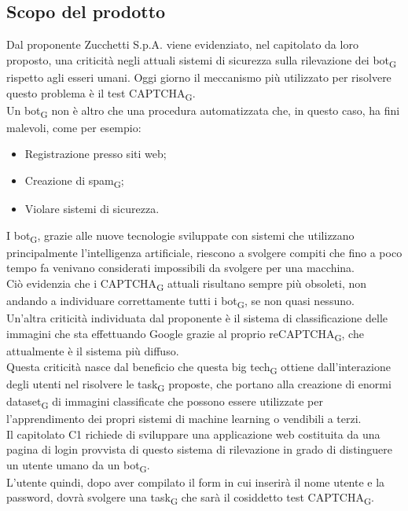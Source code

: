\subsection{Scopo del prodotto}
Dal proponente Zucchetti S.p.A. viene evidenziato, nel capitolato da loro proposto, una criticità negli attuali sistemi di sicurezza sulla rilevazione dei bot\textsubscript{G} rispetto agli esseri umani. Oggi giorno il meccanismo più utilizzato per risolvere questo problema è il test CAPTCHA\textsubscript{G}.\\
Un bot\textsubscript{G} non è altro che una procedura automatizzata che, in questo caso, ha fini malevoli, come per esempio:
\begin{itemize}
	\item Registrazione presso siti web;
	\item Creazione di spam\textsubscript{G};
	\item Violare sistemi di sicurezza.
\end{itemize}
I bot\textsubscript{G}, grazie alle nuove tecnologie sviluppate con sistemi che utilizzano principalmente l'intelligenza artificiale, riescono a svolgere compiti che fino a poco tempo fa venivano considerati impossibili da svolgere per una macchina.\\
Ciò evidenzia che i CAPTCHA\textsubscript{G} attuali risultano sempre più obsoleti, non andando a individuare correttamente tutti i bot\textsubscript{G}, se non quasi nessuno.\\
Un'altra criticità individuata dal proponente è il sistema di classificazione delle immagini che sta effettuando Google grazie al proprio reCAPTCHA\textsubscript{G}, che attualmente è il sistema più diffuso.\\
Questa criticità nasce dal beneficio che questa big tech\textsubscript{G} ottiene dall'interazione degli utenti nel risolvere le task\textsubscript{G} proposte, che portano alla creazione di enormi dataset\textsubscript{G} di immagini classificate che possono essere utilizzate per l'apprendimento dei propri sistemi di machine learning o vendibili a terzi.\\
Il capitolato C1 richiede di sviluppare una applicazione web costituita da una pagina di login provvista di questo sistema di rilevazione in grado di distinguere un utente umano da un bot\textsubscript{G}.\\
L'utente quindi, dopo aver compilato il form in cui inserirà il nome utente e la password, dovrà svolgere una task\textsubscript{G} che sarà il cosiddetto test CAPTCHA\textsubscript{G}.



